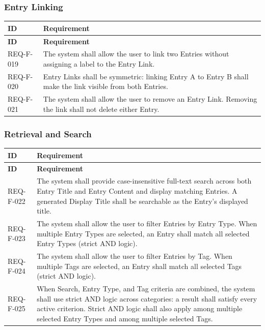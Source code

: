 \documentclass[11pt,a4paper]{article}
\begin{document}
\subsubsection{Entry Linking}
\begin{longtable}{|L{2.2cm}|L{13.6cm}|}
\hline \textbf{ID} & \textbf{Requirement} \\
\hline
\endfirsthead
\hline \textbf{ID} & \textbf{Requirement} \\
\hline
\endhead
REQ-F-019 & The system shall allow the user to link two Entries without assigning a label to the Entry Link. \\ \hline
REQ-F-020 & Entry Links shall be symmetric: linking Entry A to Entry B shall make the link visible from both Entries. \\ \hline
REQ-F-021 & The system shall allow the user to remove an Entry Link. Removing the link shall not delete either Entry. \\ \hline
\end{longtable}

\subsubsection{Retrieval and Search}
\begin{longtable}{|L{2.2cm}|L{13.6cm}|}
\hline \textbf{ID} & \textbf{Requirement} \\
\hline
\endfirsthead
\hline \textbf{ID} & \textbf{Requirement} \\
\hline
\endhead
REQ-F-022 & The system shall provide case-insensitive full-text search across both Entry Title and Entry Content and display matching Entries. A generated Display Title shall be searchable as the Entry's displayed title. \\ \hline
REQ-F-023 & The system shall allow the user to filter Entries by Entry Type. When multiple Entry Types are selected, an Entry shall match all selected Entry Types (strict AND logic). \\ \hline
REQ-F-024 & The system shall allow the user to filter Entries by Tag. When multiple Tags are selected, an Entry shall match all selected Tags (strict AND logic). \\ \hline
REQ-F-025 & When Search, Entry Type, and Tag criteria are combined, the system shall use strict AND logic across categories: a result shall satisfy every active criterion. Strict AND logic shall also apply among multiple selected Entry Types and among multiple selected Tags. \\ \hline
\end{longtable}
\end{document}
